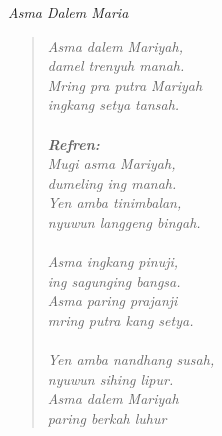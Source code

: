 \small
\begin{center}
\itshape{Asma Dalem Maria}
\end{center}


\begin{verse}
\itshape{
Asma dalem Mariyah,\\
damel trenyuh manah.\\
Mring pra putra Mariyah\\
ingkang setya tansah.\\
{~}\\
\textbf{Refren:}\\
Mugi asma Mariyah,\\
dumeling ing manah.\\
Yen amba tinimbalan,\\
nyuwun langgeng bingah.\\
{~}\\
Asma ingkang pinuji,\\
ing sagunging bangsa.\\
Asma paring prajanji\\
mring putra kang setya.\\
{~}\\
Yen amba nandhang susah,\\
nyuwun sihing lipur.\\
Asma dalem Mariyah\\
paring berkah luhur
}
\end{verse}
\normalsize

